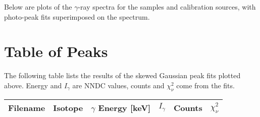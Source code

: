 \documentclass[aps,twocolumn,secnumarabic,balancelastpage,amsmath,amssymb,nofootinbib,floatfix]{revtex4-1}
\begin{document}
Below are plots of the $\gamma$-ray spectra for the samples and calibration sources, with photo-peak fits superimposed on the spectrum.



\clearpage
\section{Table of Peaks}
The following table lists the results of the skewed Gaussian peak fits plotted above.  Energy and $I_{\gamma}$ are NNDC values, counts and $\chi^2_{\nu}$ come from the fits. \\

\begin{ruledtabular}
\begin{tabular}{cccccc}
Filename & Isotope & $\gamma$ Energy [keV] & $I_{\gamma}$ & Counts & $\chi^2_{\nu}$ \\
\hline

\end{tabular}
\end{ruledtabular}
\end{document}
